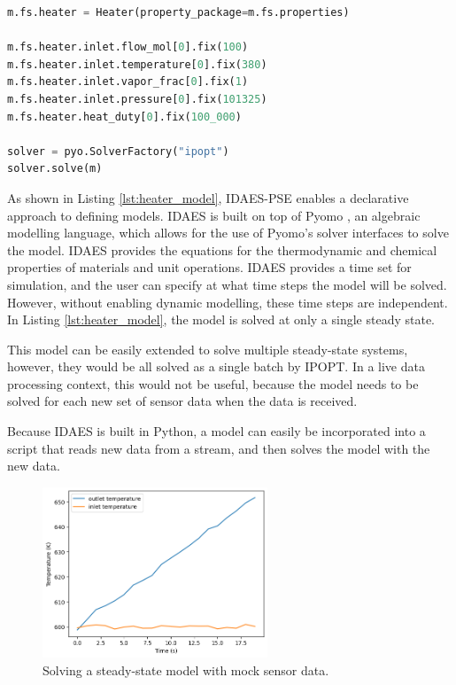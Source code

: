 \documentclass[12pt]{article}
\begin{document}
\begin{lstlisting}[language=Python,caption=Defining a simple heater model in IDAES,label=lst:heater_model]
m.fs.heater = Heater(property_package=m.fs.properties)

m.fs.heater.inlet.flow_mol[0].fix(100)
m.fs.heater.inlet.temperature[0].fix(380)
m.fs.heater.inlet.vapor_frac[0].fix(1)
m.fs.heater.inlet.pressure[0].fix(101325)
m.fs.heater.heat_duty[0].fix(100_000)

solver = pyo.SolverFactory("ipopt")
solver.solve(m)

\end{lstlisting}

As shown in Listing \ref{lst:heater_model}, IDAES-PSE enables a declarative approach to defining models. IDAES is built on top of Pyomo \cite{bynum2021pyomo}, an algebraic modelling language, which allows for the use of Pyomo's solver interfaces to solve the model. IDAES provides the equations for the thermodynamic and chemical properties of materials and unit operations. IDAES provides a time set for simulation, and the user can specify at what time steps the model will be solved. However, without enabling dynamic modelling, these time steps are independent. In Listing \ref{lst:heater_model}, the model is solved at only a single steady state.

This model can be easily extended to solve multiple steady-state systems, however, they would be all solved as a single batch by IPOPT. In a live data processing context, this would not be useful, because the model needs to be solved for each new set of sensor data when the data is received. 

Because IDAES is built in Python, a model can easily be incorporated into a script that reads new data from a stream, and then solves the model with the new data. 

\begin{figure}
    \centering
    \includegraphics[width=0.6\textwidth]{live_data_processing.png}
    \caption{Solving a steady-state model with mock sensor data.}
    \label{fig:live_mss}
\end{figure}
\end{document}
